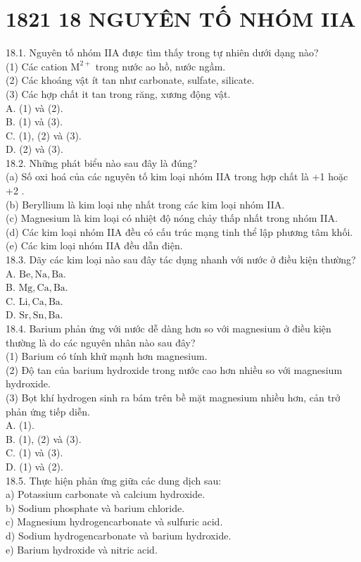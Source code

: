 \documentclass[10pt]{article}
\begin{document}
\section*{1821 18 NGUYÊN TỐ NHÓM IIA}
18.1. Nguyên tố nhóm IIA được tìm thấy trong tự nhiên dưới dạng nào?\\
(1) Các cation $\mathrm{M}^{2+}$ trong nước ao hồ, nước ngầm.\\
(2) Các khoáng vật ít tan như carbonate, sulfate, silicate.\\
(3) Các hợp chất it tan trong răng, xương động vật.\\
A. (1) và (2).\\
B. (1) và (3).\\
C. (1), (2) và (3).\\
D. (2) và (3).\\
18.2. Những phát biểu nào sau đây là đúng?\\
(a) Số oxi hoá của các nguyên tố kim loại nhóm IIA trong hợp chất là +1 hoặc +2 .\\
(b) Beryllium là kim loại nhẹ nhất trong các kim loại nhóm IIA.\\
(c) Magnesium là kim loại có nhiệt độ nóng chảy thấp nhất trong nhóm IIA.\\
(d) Các kim loại nhóm IIA đều có cấu trúc mạng tinh thể lập phương tâm khối.\\
(e) Các kim loại nhóm IIA đều dẫn điện.\\
18.3. Dãy các kim loại nào sau đây tác dụng nhanh với nước ở điều kiện thường?\\
A. $\mathrm{Be}, \mathrm{Na}, \mathrm{Ba}$.\\
B. $\mathrm{Mg}, \mathrm{Ca}, \mathrm{Ba}$.\\
C. $\mathrm{Li}, \mathrm{Ca}, \mathrm{Ba}$.\\
D. $\mathrm{Sr}, \mathrm{Sn}, \mathrm{Ba}$.\\
18.4. Barium phản ứng với nước dễ dàng hơn so với magnesium ở điều kiện thường là do các nguyên nhân nào sau đây?\\
(1) Barium có tính khử mạnh hơn magnesium.\\
(2) Độ tan của barium hydroxide trong nước cao hơn nhiều so với magnesium hydroxide.\\
(3) Bọt khí hydrogen sinh ra bám trên bề mặt magnesium nhiều hơn, cản trở phản ứng tiếp diễn.\\
A. (1).\\
B. (1), (2) và (3).\\
C. (1) và (3).\\
D. (1) và (2).\\
18.5. Thực hiện phản ứng giữa các dung dịch sau:\\
a) Potassium carbonate và calcium hydroxide.\\
b) Sodium phosphate và barium chloride.\\
c) Magnesium hydrogencarbonate và sulfuric acid.\\
d) Sodium hydrogencarbonate và barium hydroxide.\\
e) Barium hydroxide và nitric acid.
\end{document}
